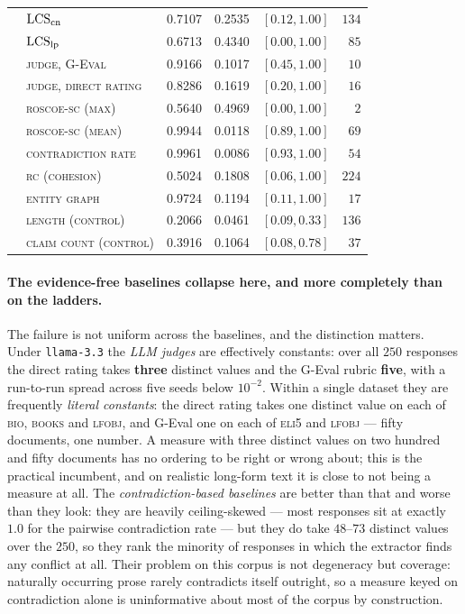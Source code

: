 \begin{table}[t]
\begin{tabular}{@{}llrrrr@{}}
 & $\mathrm{LCS}_{\mathrm{cn}}$ & 0.7107 & 0.2535 & $[0.12, 1.00]$ & $134$ \\
 & $\mathrm{LCS}_{\mathrm{lp}}$ & 0.6713 & 0.4340 & $[0.00, 1.00]$ & $85$ \\
 & \textsc{judge, G-Eval} & 0.9166 & 0.1017 & $[0.45, 1.00]$ & $10$ \\
 & \textsc{judge, direct rating} & 0.8286 & 0.1619 & $[0.20, 1.00]$ & $16$ \\
 & \textsc{roscoe-sc (max)} & 0.5640 & 0.4969 & $[0.00, 1.00]$ & $2$ \\
 & \textsc{roscoe-sc (mean)} & 0.9944 & 0.0118 & $[0.89, 1.00]$ & $69$ \\
 & \textsc{contradiction rate} & 0.9961 & 0.0086 & $[0.93, 1.00]$ & $54$ \\
 & \textsc{rc (cohesion)} & 0.5024 & 0.1808 & $[0.06, 1.00]$ & $224$ \\
 & \textsc{entity graph} & 0.9724 & 0.1194 & $[0.11, 1.00]$ & $17$ \\
 & \textsc{length (control)} & 0.2066 & 0.0461 & $[0.09, 0.33]$ & $136$ \\
 & \textsc{claim count (control)} & 0.3916 & 0.1064 & $[0.08, 0.78]$ & $37$ \\
\bottomrule
\end{tabular}
\end{table}

\paragraph{The evidence-free baselines collapse here, and more completely than on the ladders.}
The failure is not uniform across the baselines, and the distinction matters. Under
\texttt{llama-3.3} the \emph{LLM judges} are effectively constants: over all $250$ responses the direct
rating takes
\textbf{three} distinct values and the G-Eval rubric \textbf{five}, with a run-to-run spread across five
seeds below $10^{-2}$. Within a single dataset they are frequently \emph{literal constants}: the direct
rating takes one distinct value on each of \textsc{bio}, \textsc{books} and \textsc{lfobj}, and G-Eval
one on each of \textsc{eli5} and \textsc{lfobj} --- fifty documents, one number. A measure with three
distinct values on two hundred and fifty documents has no ordering to be right or wrong about; this is the practical incumbent, and on realistic long-form text it is close to not being
a measure at all. The \emph{contradiction-based baselines} are better than that and worse than they
look: they are heavily ceiling-skewed --- most responses sit at exactly $1.0$ for the pairwise
contradiction rate --- but they do take $48$--$73$ distinct values over the $250$, so they
rank the minority of responses in which the extractor finds any conflict at all. Their problem on this
corpus is not degeneracy but coverage: naturally occurring prose rarely contradicts itself outright, so
a measure keyed on contradiction alone is uninformative about most of the corpus by construction.

